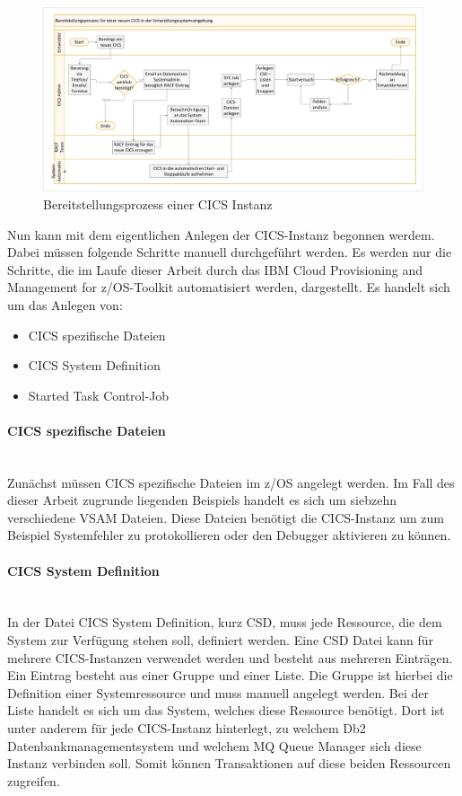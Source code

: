 \begin{figure}[ht!]
\centering
\includegraphics[width=\paperwidth,angle=90]{figures/swimlaneCICS.pdf}
\caption{Bereitstellungsprozess einer CICS Instanz}
\label{fig:aktcics}
\end{figure}

Nun kann mit dem eigentlichen Anlegen der CICS-Instanz begonnen werdem.
Dabei müssen folgende Schritte manuell durchgeführt werden.
Es werden nur die Schritte, die im Laufe dieser Arbeit durch das \glqq IBM Cloud Provisioning and Management for z/OS\grqq-Toolkit automatisiert werden, dargestellt.
Es handelt sich um das Anlegen von:

\begin{itemize}
\item CICS spezifische Dateien
\item \glqq CICS System Definition\grqq
\item Started Task Control-Job
\end{itemize}

\paragraph{CICS spezifische Dateien}\label{sssec:speziDat} ~\\
Zunächst müssen CICS spezifische Dateien im z/OS angelegt werden.
Im Fall des dieser Arbeit zugrunde liegenden Beispiels handelt es sich um siebzehn verschiedene VSAM Dateien.
Diese Dateien benötigt die CICS-Instanz um zum Beispiel Systemfehler zu protokollieren oder den Debugger aktivieren zu können.

\paragraph{\glqq CICS System Definition\grqq} ~\\
In der Datei \glqq CICS System Definition\grqq, kurz CSD, muss jede Ressource, die dem System zur Verfügung stehen soll, definiert werden.
Eine CSD Datei kann für mehrere CICS-Instanzen verwendet werden und besteht aus mehreren Einträgen.
Ein Eintrag besteht aus einer Gruppe und einer Liste.
Die Gruppe ist hierbei die Definition einer Systemressource und muss manuell angelegt werden.
Bei der Liste handelt es sich um das System, welches diese Ressource benötigt.
Dort ist unter anderem für jede CICS-Instanz hinterlegt, zu welchem Db2 Datenbankmanagementsystem und welchem MQ Queue Manager sich diese Instanz verbinden soll.
Somit können Transaktionen auf diese beiden Ressourcen zugreifen.

